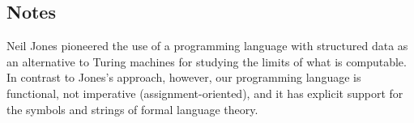 \subsection{Notes}

Neil Jones \cite{Jones97} pioneered the use of a programming language
with structured data as an alternative to Turing machines for studying
the limits of what is computable.  In contrast to Jones's approach,
however, our programming language is functional, not imperative
(assignment-oriented), and it has explicit support for the symbols and
strings of formal language theory.

